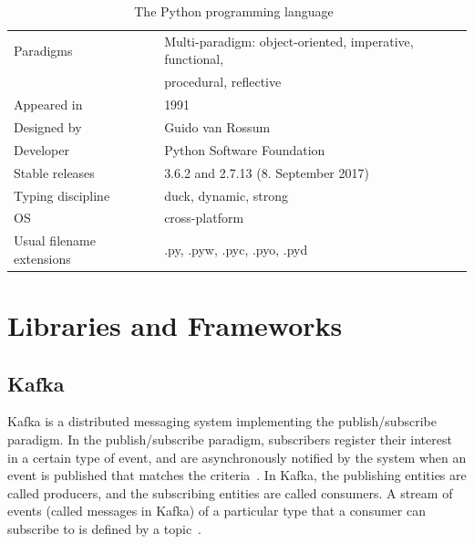 \begin{table}
    \caption{The Python programming language~\cite{van2007python}}
    \label{table:python}
    \vspace{0.2cm}
    \begin{tabular}{l | l} %
        Paradigms
        & Multi-paradigm: object-oriented, imperative, functional,
        \\ & procedural, reflective
        \\ \midrule
        Appeared in
        & 1991
        \\ \midrule
        Designed by
        & Guido van Rossum
        \\ \midrule
        Developer
        & Python Software Foundation
        \\ \midrule
        Stable releases
        & 3.6.2 and 2.7.13 (8. September 2017)
        \\ \midrule
        Typing discipline
        & duck, dynamic, strong
        \\ \midrule
        OS
        & cross-platform
        \\ \midrule
        Usual filename extensions
        & .py, .pyw, .pyc, .pyo, .pyd
    \end{tabular}
\end{table}

\section{Libraries and Frameworks}
\label{sec:libraries}

\subsection{Kafka}
\label{subsec:kafka}

Kafka is a distributed messaging system implementing the publish/subscribe paradigm.
In the publish/subscribe paradigm, subscribers register their interest in a certain type of event,
and are asynchronously notified by the system when an event is published that matches the criteria~\cite{Eugster2003}.
In Kafka, the publishing entities are called producers, and the subscribing entities are called consumers.
A stream of events (called messages in Kafka) of a particular type that a consumer can subscribe to is defined by a topic~\cite{Kreps2015}.

